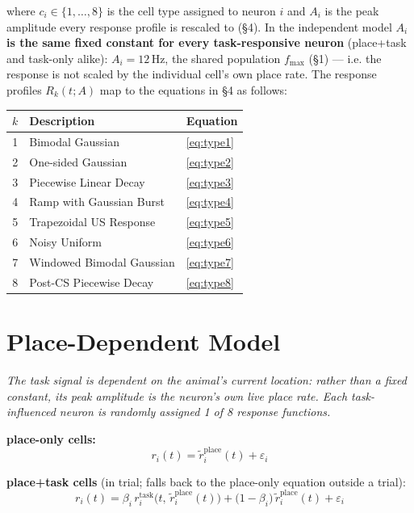 \documentclass{article}
\begin{document}
\noindent
where $c_i \in \{1,\dots,8\}$ is the cell type assigned to neuron $i$ and $A_i$ is the
peak amplitude every response profile is rescaled to (\S4). In the independent model
\textbf{$A_i$ is the same fixed constant for every task-responsive neuron}
(place+task and task-only alike): $A_i = 12\,\text{Hz}$, the shared population $f_{\max}$
(\S1) --- i.e. the response is not scaled by the individual cell's own place rate.
The response profiles $R_k(t; A)$ map to the equations in \S4 as follows:

\medskip
\begin{center}
\begin{tabular}{cll}
    \hline
    $k$ & Description & Equation \\
    \hline
    1 & Bimodal Gaussian          & \eqref{eq:type1} \\
    2 & One-sided Gaussian        & \eqref{eq:type2} \\
    3 & Piecewise Linear Decay    & \eqref{eq:type3} \\
    4 & Ramp with Gaussian Burst  & \eqref{eq:type4} \\
    5 & Trapezoidal US Response   & \eqref{eq:type5} \\
    6 & Noisy Uniform             & \eqref{eq:type6} \\
    7 & Windowed Bimodal Gaussian & \eqref{eq:type7} \\
    8 & Post-CS Piecewise Decay   & \eqref{eq:type8} \\
    \hline
\end{tabular}
\end{center}

\section{Place-Dependent Model}

\textit{The task signal is dependent on the animal's current location: rather than a
fixed constant, its peak amplitude is the neuron's own live place rate. Each
task-influenced neuron is randomly assigned 1 of 8 response functions.}

\bigskip\noindent
\textbf{place-only cells:}
\begin{equation}
    r_i(t) = \tilde{r}^{\mathrm{place}}_i(t) + \varepsilon_i
\end{equation}

\noindent
\textbf{place+task cells} (in trial; falls back to the place-only equation outside a trial):
\begin{equation}
    r_i(t) = \beta_i\, r^{\mathrm{task}}_i\!\bigl(t,\,\tilde{r}^{\mathrm{place}}_i(t)\bigr)
           + \bigl(1 - \beta_i\bigr)\, \tilde{r}^{\mathrm{place}}_i(t)
           + \varepsilon_i
\end{equation}
\end{document}
